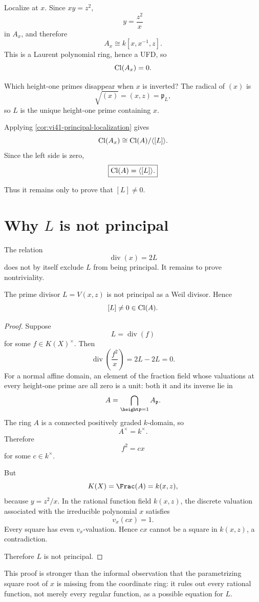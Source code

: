 Localize at \(x\). Since \(xy=z^2\),
\[
  y=\frac{z^2}{x}
\]
in \(A_x\), and therefore
\[
  A_x\cong k[x,x^{-1},z].
\]
This is a Laurent polynomial ring, hence a UFD, so
\[
  \operatorname{Cl}(A_x)=0.
\]

Which height-one primes disappear when \(x\) is inverted? The radical of \((x)\) is
\[
  \sqrt{(x)}=(x,z)=\mathfrak p_L,
\]
so \(L\) is the unique height-one prime containing \(x\).

Applying \cref{cor:vi41-principal-localization} gives
\[
  \operatorname{Cl}(A_x)
  \cong
  \operatorname{Cl}(A)/\langle[L]\rangle.
\]
Since the left side is zero,
\[
  \boxed{\operatorname{Cl}(A)=\langle[L]\rangle.}
\]

Thus it remains only to prove that \([L]\neq0\).

\section{Why \(L\) is not principal}

The relation
\[
  \operatorname{div}(x)=2L
\]
does not by itself exclude \(L\) from being principal. It remains to prove nontriviality.

\begin{theorem}\label{thm:vi41-L-nonprincipal}
The prime divisor \(L=V(x,z)\) is not principal as a Weil divisor. Hence
\[
  [L]\neq0\in\operatorname{Cl}(A).
\]
\end{theorem}

\begin{proof}
Suppose
\[
  L=\operatorname{div}(f)
\]
for some \(f\in K(X)^\times\). Then
\[
 \operatorname{div}\!\left(\frac{f^2}{x}\right)
 =
 2L-2L
 =
 0.
\]
For a normal affine domain, an element of the fraction field whose valuations at every height-one prime are all zero is a unit: both it and its inverse lie in
\[
 A=\bigcap_{\height\mathfrak p=1}A_{\mathfrak p}.
\]
The ring \(A\) is a connected positively graded \(k\)-domain, so
\[
 A^\times=k^\times.
\]
Therefore
\[
  f^2=cx
\]
for some \(c\in k^\times\).

But
\[
  K(X)=\Frac(A)=k(x,z),
\]
because \(y=z^2/x\). In the rational function field \(k(x,z)\), the discrete valuation associated with the irreducible polynomial \(x\) satisfies
\[
  v_x(cx)=1.
\]
Every square has even \(v_x\)-valuation. Hence \(cx\) cannot be a square in \(k(x,z)\), a contradiction.

Therefore \(L\) is not principal.
\end{proof}

This proof is stronger than the informal observation that the parametrizing square root of \(x\) is missing from the coordinate ring: it rules out every rational function, not merely every regular function, as a possible equation for \(L\).

